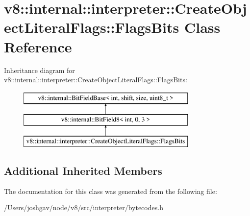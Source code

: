 \hypertarget{classv8_1_1internal_1_1interpreter_1_1_create_object_literal_flags_1_1_flags_bits}{}\section{v8\+:\+:internal\+:\+:interpreter\+:\+:Create\+Object\+Literal\+Flags\+:\+:Flags\+Bits Class Reference}
\label{classv8_1_1internal_1_1interpreter_1_1_create_object_literal_flags_1_1_flags_bits}
Inheritance diagram for v8\+:\+:internal\+:\+:interpreter\+:\+:Create\+Object\+Literal\+Flags\+:\+:Flags\+Bits\+:\begin{figure}[H]
\begin{center}
\leavevmode
\includegraphics[height=3.000000cm]{classv8_1_1internal_1_1interpreter_1_1_create_object_literal_flags_1_1_flags_bits}
\end{center}
\end{figure}
\subsection*{Additional Inherited Members}


The documentation for this class was generated from the following file\+:\begin{DoxyCompactItemize}
\item 
/\+Users/joshgav/node/v8/src/interpreter/bytecodes.\+h\end{DoxyCompactItemize}
